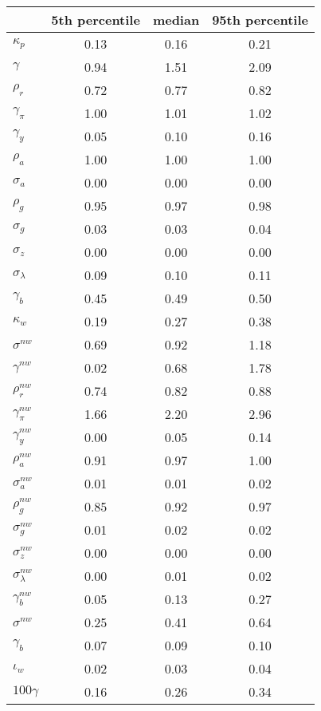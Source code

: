 \begin{tabular}{|l|c|c|c|}
\hline
&\textbf{5th percentile}&\textbf{median}&\textbf{95th percentile}\\\hline
\textbf{$\kappa_p$}&0.13&0.16&0.21\\\hline
\textbf{$\gamma$}&0.94&1.51&2.09\\\hline
\textbf{$\rho_r$}&0.72&0.77&0.82\\\hline
\textbf{$\gamma_{\pi}$}&1.00&1.01&1.02\\\hline
\textbf{$\gamma_{y}$}&0.05&0.10&0.16\\\hline
\textbf{$\rho_a$}&1.00&1.00&1.00\\\hline
\textbf{$\sigma_a$}&0.00&0.00&0.00\\\hline
\textbf{$\rho_g$}&0.95&0.97&0.98\\\hline
\textbf{$\sigma_g$}&0.03&0.03&0.04\\\hline
\textbf{$\sigma_z$}&0.00&0.00&0.00\\\hline
\textbf{$\sigma_{\lambda}$}&0.09&0.10&0.11\\\hline
\textbf{$\gamma_b$}&0.45&0.49&0.50\\\hline
\textbf{$\kappa_w$}&0.19&0.27&0.38\\\hline
\textbf{$\sigma^{nw}$}&0.69&0.92&1.18\\\hline
\textbf{$\gamma^{nw}$}&0.02&0.68&1.78\\\hline
\textbf{$\rho_r^{nw}$}&0.74&0.82&0.88\\\hline
\textbf{$\gamma_{\pi}^{nw}$}&1.66&2.20&2.96\\\hline
\textbf{$\gamma_{y}^{nw}$}&0.00&0.05&0.14\\\hline
\textbf{$\rho_a^{nw}$}&0.91&0.97&1.00\\\hline
\textbf{$\sigma_a^{nw}$}&0.01&0.01&0.02\\\hline
\textbf{$\rho_g^{nw}$}&0.85&0.92&0.97\\\hline
\textbf{$\sigma_g^{nw}$}&0.01&0.02&0.02\\\hline
\textbf{$\sigma_z^{nw}$}&0.00&0.00&0.00\\\hline
\textbf{$\sigma_{\lambda}^{nw}$}&0.00&0.01&0.02\\\hline
\textbf{$\gamma_b^{nw}$}&0.05&0.13&0.27\\\hline
\textbf{$\sigma^{nw}$}&0.25&0.41&0.64\\\hline
\textbf{$\gamma_b$}&0.07&0.09&0.10\\\hline
\textbf{$\iota_w$}&0.02&0.03&0.04\\\hline
\textbf{$100\gamma$}&0.16&0.26&0.34\\\hline

\end{tabular}
